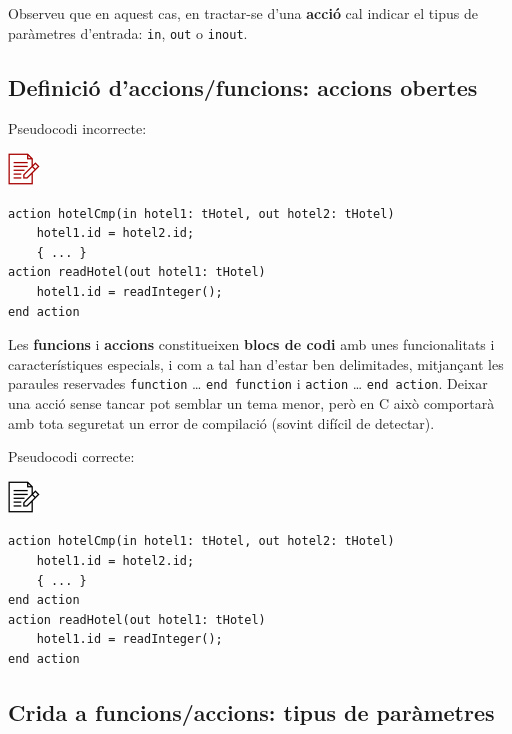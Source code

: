 \documentclass[
]{book}
\begin{document}
Observeu que en aquest cas, en tractar-se d'una \textbf{acció} cal indicar el tipus de paràmetres d'entrada: \texttt{in}, \texttt{out} o \texttt{inout}.

\hypertarget{definiciuxf3-daccionsfuncions-accions-obertes}{%
\subsection{Definició d'accions/funcions: accions obertes}\label{definiciuxf3-daccionsfuncions-accions-obertes}}

Pseudocodi incorrecte:

\includegraphics{./img/alg_err.png}

\begin{verbatim}
action hotelCmp(in hotel1: tHotel, out hotel2: tHotel)
    hotel1.id = hotel2.id;
    { ... }
action readHotel(out hotel1: tHotel)
    hotel1.id = readInteger();
end action
\end{verbatim}

Les \textbf{funcions} i \textbf{accions} constitueixen \textbf{blocs de codi} amb unes funcionalitats i característiques especials, i com a tal han d'estar ben delimitades, mitjançant les paraules reservades \texttt{function} \ldots{} \texttt{end\ function} i \texttt{action} \ldots{} \texttt{end\ action}. Deixar una acció sense tancar pot semblar un tema menor, però en C això comportarà amb tota seguretat un error de compilació (sovint difícil de detectar).

Pseudocodi correcte:

\includegraphics{./img/alg.png}

\begin{verbatim}
action hotelCmp(in hotel1: tHotel, out hotel2: tHotel)
    hotel1.id = hotel2.id;
    { ... }
end action
action readHotel(out hotel1: tHotel)
    hotel1.id = readInteger();
end action
\end{verbatim}

\hypertarget{crida-a-funcionsaccions-tipus-de-paruxe0metres}{%
\subsection{Crida a funcions/accions: tipus de paràmetres}\label{crida-a-funcionsaccions-tipus-de-paruxe0metres}}
\end{document}
